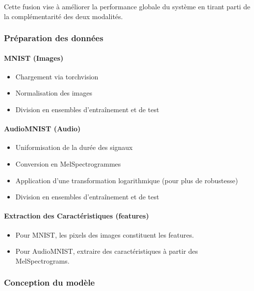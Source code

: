 Cette fusion vise à améliorer la performance globale du système en tirant parti de la complémentarité des deux modalités.

\subsubsection{Préparation des données}
\label{subsubsec:prep_multi}

\paragraph{MNIST (Images)}
\begin{itemize}
    \item Chargement via torchvision
    \item Normalisation des images
    \item Division en ensembles d'entraînement et de test
\end{itemize}

\paragraph{AudioMNIST (Audio)}
\begin{itemize}
    \item Uniformisation de la durée des signaux
    \item Conversion en MelSpectrogrammes
    \item Application d'une transformation logarithmique (pour plus de robustesse)
    \item Division en ensembles d'entraînement et de test
\end{itemize}

\paragraph{Extraction des Caractéristiques (features)}
\begin{itemize}
    \item Pour MNIST, les pixels des images constituent les features.
    \item Pour AudioMNIST, extraire des caractéristiques à partir des MelSpectrograms.
\end{itemize}

\subsubsection{Conception du modèle}
\label{subsubsec:conception}

